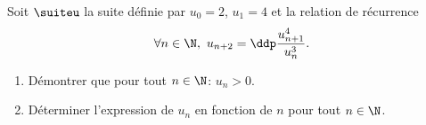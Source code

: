 \begin{exercice}
Soit $\suiteu$ la suite d\'efinie par $u_0=2$, $u_1=4$ et la relation de r\'ecurrence
$$\forall n\in\N,\ u_{n+2}=\ddp\frac{u_{n+1}^4}{u_n^3}.$$
\begin{enumerate}
\item D\'emontrer que pour tout $n\in\N$: $u_n>0$.
\item D\'eterminer l'expression de $u_n$ en fonction de $n$ pour tout $n\in\N$.
\end{enumerate}
\end{exercice}